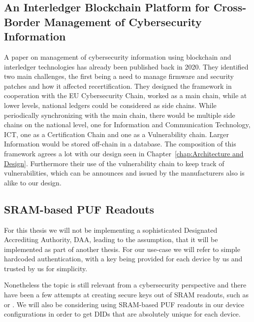 \subsection{An Interledger Blockchain Platform for Cross-Border Management of Cybersecurity Information} %
\label{sub:An Interledger Blockchain Platform for Cross-Border Management of Cybersecurity Information}
A paper on management of cybersecurity information using blockchain and interledger technologies has already been
published back in 2020. \cite{skarmeta-interledger-management-2020} They identified two main challenges, the first being
a need to manage firmware and security patches and how it affected recertification.
They designed the framework in cooperation with the EU Cybersecurity Chain, worked as a main chain, while at lower
levels, national ledgers could be considered as side chains.
While periodically synchronizing with the main chain, there would be multiple side chains on the national level, one for
Information and Communication Technology, ICT, one as a Certification Chain and one as a Vulnerability chain.
Larger Information would be stored off-chain in a database.
The composition of this framework agrees a lot with our design seen in Chapter~\ref{chap:Architecture and Design}.
Furthermore their use of the vulnerability chain to keep track of vulnerabilities, which can be announces and issued by
the manufacturers also is alike to our design.

\subsection{SRAM-based PUF Readouts} %
\label{sub:SRAM-based PUF Readouts}
For this thesis we will not be implementing a sophisticated Designated Accrediting Authority, DAA, leading to the
assumption, that it will be implemented as part of another thesis. For our use-case we will refer to simple
hardcoded authentication, with a key being provided for each device by us and trusted by us for simplicity.

Nonetheless the topic is still relevant from a cybersecurity perspective and there have been a few attempts at creating
secure keys out of SRAM readouts, such as \cite{vinagrero2023sram} or \cite{Niya_Jeffrey_Stiller_2020}.
We will also be considering using SRAM-based PUF readouts in our device configurations in order to get DIDs that are
absolutely unique for each device.


